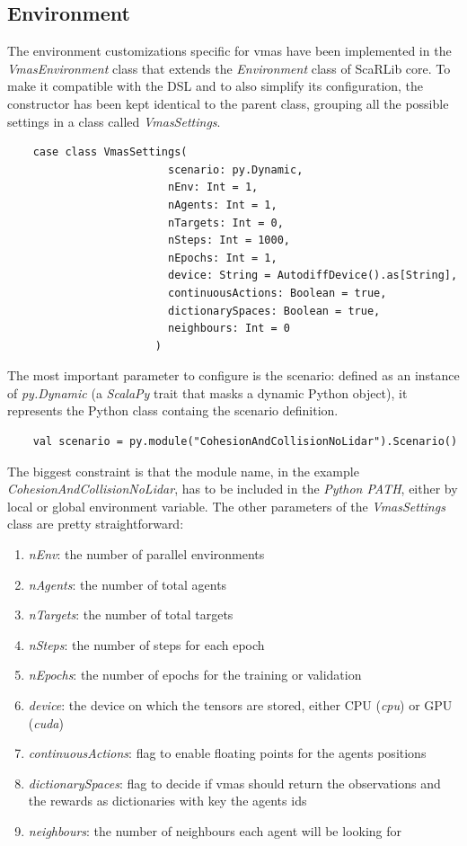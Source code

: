 \documentclass[12pt,a4paper,openright,twoside]{book}
\begin{document}
\subsection{Environment}
The environment customizations specific for \ac{vmas} have been implemented in the \emph{VmasEnvironment} class that extends the \emph{Environment} class of ScaRLib core.
To make it compatible with the DSL and to also simplify its configuration, the constructor has been kept identical to the parent class, grouping all the possible
settings in a class called \emph{VmasSettings}.
\begin{lstlisting}
    case class VmasSettings(
                         scenario: py.Dynamic,
                         nEnv: Int = 1,
                         nAgents: Int = 1,
                         nTargets: Int = 0,
                         nSteps: Int = 1000,
                         nEpochs: Int = 1,
                         device: String = AutodiffDevice().as[String],
                         continuousActions: Boolean = true,
                         dictionarySpaces: Boolean = true,
                         neighbours: Int = 0
                       )
\end{lstlisting}
The most important parameter to configure is the scenario: defined as an instance of \emph{py.Dynamic} (a \emph{ScalaPy} trait that masks a dynamic Python object),
it represents the Python class containg the scenario definition.
\begin{lstlisting}
    val scenario = py.module("CohesionAndCollisionNoLidar").Scenario()
\end{lstlisting}
The biggest constraint is that the module name, in the example \emph{CohesionAndCollisionNoLidar}, has to be included in the \emph{Python PATH}, either by local or global environment variable.
The other parameters of the \emph{VmasSettings} class are pretty straightforward:
\begin{enumerate}
    \item \emph{nEnv}: the number of parallel environments
    \item \emph{nAgents}: the number of total agents
    \item \emph{nTargets}: the number of total targets
    \item \emph{nSteps}: the number of steps for each epoch
    \item \emph{nEpochs}: the number of epochs for the training or validation
    \item \emph{device}: the device on which the tensors are stored, either CPU (\emph{cpu}) or GPU (\emph{cuda})
    \item \emph{continuousActions}: flag to enable floating points for the agents positions
    \item \emph{dictionarySpaces}: flag to decide if \ac{vmas} should return the observations and the rewards as dictionaries with key the agents ids
    \item \emph{neighbours}: the number of neighbours each agent will be looking for
\end{enumerate}
\end{document}

